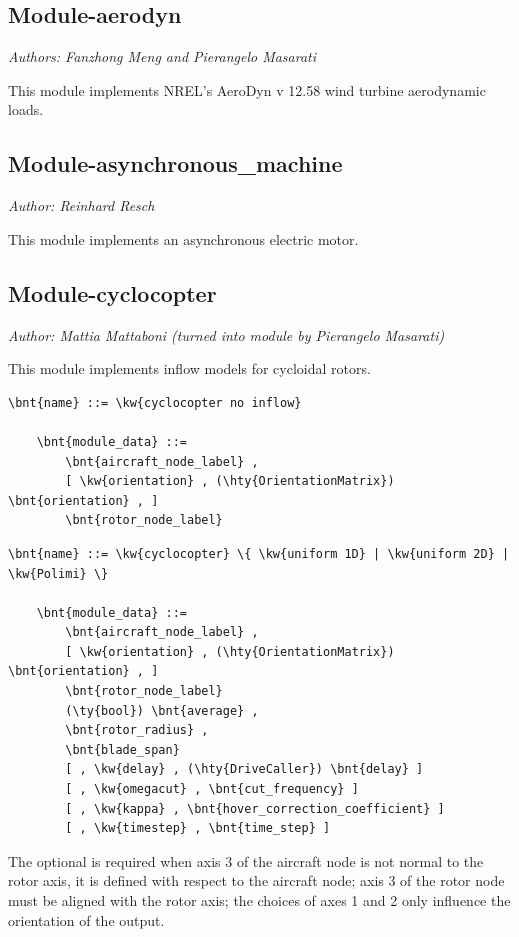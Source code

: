 \subsection{Module-aerodyn}
\emph{Authors: Fanzhong Meng and Pierangelo Masarati}

\noindent
This module implements NREL's AeroDyn v 12.58 wind turbine aerodynamic loads.

\subsection{Module-asynchronous\_machine}
\emph{Author: Reinhard Resch}

\noindent
This module implements an asynchronous electric motor.

\subsection{Module-cyclocopter}
\label{sec:MODULES:CYCLOCOPTER}
\emph{Author: Mattia Mattaboni (turned into module by Pierangelo Masarati)}

\noindent
This module implements inflow models for cycloidal rotors.

\begin{Verbatim}[commandchars=\\\{\}]
    \bnt{name} ::= \kw{cyclocopter no inflow}

    \bnt{module_data} ::=
        \bnt{aircraft_node_label} ,
        [ \kw{orientation} , (\hty{OrientationMatrix}) \bnt{orientation} , ]
        \bnt{rotor_node_label}
\end{Verbatim}

\begin{Verbatim}[commandchars=\\\{\}]
    \bnt{name} ::= \kw{cyclocopter} \{ \kw{uniform 1D} | \kw{uniform 2D} | \kw{Polimi} \}

    \bnt{module_data} ::=
        \bnt{aircraft_node_label} ,
        [ \kw{orientation} , (\hty{OrientationMatrix}) \bnt{orientation} , ]
        \bnt{rotor_node_label}
        (\ty{bool}) \bnt{average} ,
        \bnt{rotor_radius} ,
        \bnt{blade_span}
        [ , \kw{delay} , (\hty{DriveCaller}) \bnt{delay} ]
        [ , \kw{omegacut} , \bnt{cut_frequency} ]
        [ , \kw{kappa} , \bnt{hover_correction_coefficient} ]
        [ , \kw{timestep} , \bnt{time_step} ]
\end{Verbatim}


The optional  is required when axis 3 
of the aircraft node is not normal to the rotor axis, it is defined with respect to the aircraft node; axis 3
of the rotor node must be aligned with the rotor axis; the choices of axes 1 and 2 only influence the orientation of the output.


